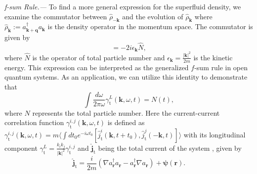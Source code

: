 \documentclass[aps,prl,twocolumn,superscriptaddress,]{revtex4-1}
\begin{document}
\emph{f-sum Rule.--- }To find a more general expression for the superfluid density, we examine the commutator between $\hat{\rho}_{-\bm{k}}$ and the evolution of $\hat{\rho}_{\bm{k}}$ where $\hat{\rho}_{\bm{k}}:=a_{\bm{k+q}}^{\dagger}a_{\bm{k}}$ is the density operator in the momentum space. The commutator is given by
\begin{equation}
[\hat{\rho}_{-\bm{k}},\mathcal{L}^{\dagger}(\hat{\rho}_{\bm{k}})]=-2i\epsilon_{\bm{k}}\hat{N},
\end{equation}
where $\hat{N}$ is the operator of total particle number and $\epsilon_{\bm{k}}=\frac{|\bm{k}|^{2}}{2m}$
is the kinetic energy. This expression can be interpreted as the generalized
$f$-sum rule in open quantum systems. As an application, we can utilize
this identity to demonstrate that 
\begin{equation}
\int\frac{d\omega}{2\pi\omega}\gamma_{\mathrm{t}}^{L}(\bm{k},\omega,t)=N(t),\label{eq:Application_sum_rule}
\end{equation}
where $N$ represents the total particle number. Here the current-current
correlation function $\gamma_{\mathrm{t}}^{i,j}(\bm{k},\omega,t)$
is defined as $\gamma_{\mathrm{t}}^{i,j}(\bm{k},\omega,t)=m\langle\int dt_{0}e^{-i\omega t_{0}}[\hat{j}_{\mathrm{t}}^{i}(\bm{k},t+t_{0}),\hat{j}_{\mathrm{t}}^{j}(-\bm{k},t)]\rangle$
with its longitudinal component $\gamma_{\mathrm{t}}^{L}=\frac{k_{i}k_{j}}{|\bm{k}|^{2}}\gamma_{\mathrm{t}}^{i,j}$
and $\hat{\bm{j}}_{\mathrm{t}}$ being the total current of the system \citep{SupplementaryMaterial,PhysRevLett.93.160404},
given by
\begin{equation}
\hat{\bm{j}}_{\mathrm{t}}=\frac{i}{2m}\left(\nabla a_{\bm{r}}^{\dagger}a_{\bm{r}}-a_{\bm{r}}^{\dagger}\nabla a_{\bm{r}}\right)+\bm{\psi}(\bm{r}).
\end{equation}
\end{document}
